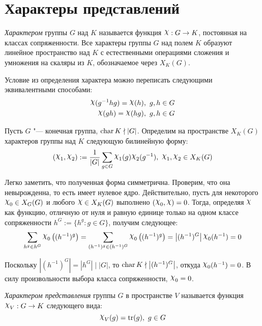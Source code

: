 \section{Характеры представлений}

\begin{definition}
	\textit{Характером} группы $G$ над $K$ называется функция $\Chi : G \to K$, постоянная на классах сопряженности. Все характеры группы $G$ над полем $K$ образуют линейное пространство над $K$ с естественными операциями сложения и умножения на скаляры из $K$, обозначаемое через $X_K(G)$.
\end{definition}

\begin{note}
	Условие из определения характера можно переписать следующими эквивалентными способами:
	\begin{align*}
		\Chi(g^{-1}hg) = \Chi(h),~g, h \in G\\
		\Chi(gh) = \Chi(hg),~g, h \in G
	\end{align*}
\end{note}

\begin{note}
	Пусть $G$ "--- конечная группа, $\operatorname{char} K \nmid |G|$. Определим на пространстве $X_K(G)$ характеров группы над $K$ следующую билинейную форму:
	\[(\Chi_1, \Chi_2) := \frac1{|G|}\sum_{g \in G}\Chi_1(g)\Chi_2(g^{-1}),~\Chi_1, \Chi_2 \in X_K(G)\]
	
	Легко заметить, что полученная форма симметрична. Проверим, что она невырожденна, то есть имеет нулевое ядро. Действительно, пусть для некоторого $\Chi_0 \in X_G(G)$ и любого $\Chi \in X_K(G)$ выполнено $(\Chi_0, \Chi) = 0$. Тогда, определяя $\Chi$ как функцию, отличную от нуля и равную единице только на одном классе сопряженности $h^G := \{h^g : g \in G\}$, получим следующее:
	\[\sum_{h^g \in h^G}\Chi_0\left((h^{-1})^g\right) = \sum_{(h^{-1})^g \in (h^{-1})^G}\Chi_0\left((h^{-1})^g\right) = \left|(h^{-1})^G\right| \Chi_0(h^{-1}) = 0\]
	
	Поскольку $\left|(h^{-1})^G\right| = \left|h^G\right| \mid |G|$, то $\operatorname{char} K \nmid \left|(h^{-1})^G\right|$, откуда $\Chi_0(h^{-1}) = 0$. В силу произвольности выбора класса сопряженности, $\Chi_0 = 0$.
\end{note}

\begin{definition}
	\textit{Характером представления} группы $G$ в пространстве $V$ называется функция $\Chi_V: G \to K$ следующего вида:
	\[\Chi_V(g) = \tr(g),~g \in G\]
\end{definition}

